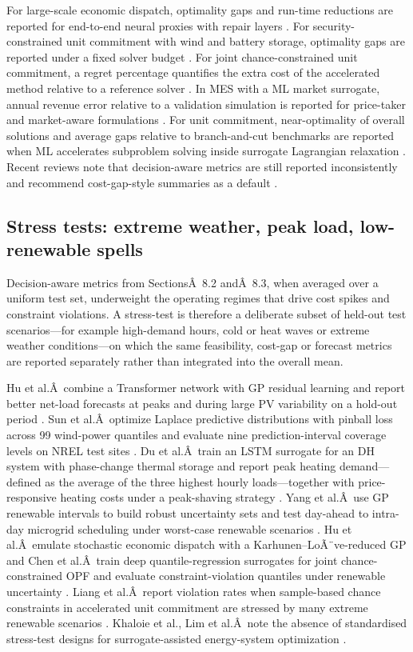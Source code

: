 For large-scale economic dispatch, optimality gaps and run-time
reductions are reported for end-to-end neural proxies with repair layers
\cite{Chen20244723}. For security-constrained unit commitment with wind and
battery storage, optimality gaps are reported under a fixed solver
budget \cite{Wu2022231}. For joint chance-constrained unit commitment, a
regret percentage quantifies the extra cost of the accelerated method
relative to a reference solver \cite{Liang20246508}. In MES with a ML market
surrogate, annual revenue error relative to a validation simulation is
reported for price-taker and market-aware formulations \cite{Jalving2023}.
For unit commitment, near-optimality of overall solutions and average
gaps relative to branch-and-cut benchmarks are reported when ML
accelerates subproblem solving inside surrogate Lagrangian relaxation
\cite{Wu2024391}. Recent reviews note that decision-aware metrics are still
reported inconsistently and recommend cost-gap-style summaries as a
default \cite{Ruan2021221,Khaloie2025,Lim2025}.

\subsection{Stress tests: extreme weather, peak load, low-renewable spells}
\label{sec:val:stress}

Decision-aware metrics from
SectionsÂ~8.2
andÂ~8.3, when averaged over a uniform test set,
underweight the operating regimes that drive cost spikes and constraint
violations. A stress-test is therefore a deliberate subset of held-out
test scenarios---for example high-demand hours, cold or heat waves or
extreme weather conditions---on which the same feasibility, cost-gap or
forecast metrics are reported separately rather than integrated into the
overall mean.

Hu et al.Â~combine a Transformer network with GP residual learning and
report better net-load forecasts at peaks and during large PV
variability on a hold-out period \cite{Hu2024}. Sun et al.Â~optimize Laplace
predictive distributions with pinball loss across 99 wind-power
quantiles and evaluate nine prediction-interval coverage levels on NREL
test sites \cite{Sun20191497}. Du et al.Â~train an LSTM surrogate for an DH
system with phase-change thermal storage and report peak heating
demand---defined as the average of the three highest hourly
loads---together with price-responsive heating costs under a
peak-shaving strategy \cite{Du2025}. Yang et al.Â~use GP renewable intervals
to build robust uncertainty sets and test day-ahead to intra-day
microgrid scheduling under worst-case renewable scenarios
\cite{Yang2024__2}. Hu et al.Â~emulate stochastic economic dispatch with a
Karhunen--LoÃ¨ve-reduced GP and Chen et al.Â~train deep
quantile-regression surrogates for joint chance-constrained OPF and
evaluate constraint-violation quantiles under renewable uncertainty
\cite{Chen2023657}. Liang et al.Â~report violation rates when sample-based
chance constraints in accelerated unit commitment are stressed by many
extreme renewable scenarios \cite{Liang20246508}. Khaloie et al., Lim et
al.Â~note the absence of standardised stress-test
designs for surrogate-assisted energy-system optimization
\cite{Khaloie2025,Lim2025}.

